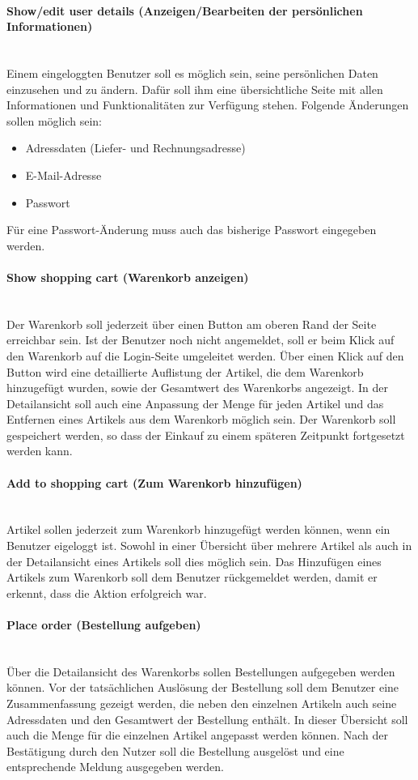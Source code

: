 \paragraph{Show/edit user details (Anzeigen/Bearbeiten der persönlichen Informationen)}$\;$ \\
Einem eingeloggten Benutzer soll es möglich sein, seine persönlichen Daten einzusehen und zu ändern.
Dafür soll ihm eine übersichtliche Seite mit allen Informationen und Funktionalitäten zur Verfügung stehen.
Folgende Änderungen sollen möglich sein:
\begin{itemize}
\item Adressdaten (Liefer- und Rechnungsadresse)
\item E-Mail-Adresse
\item Passwort
\end{itemize}
Für eine Passwort-Änderung muss auch das bisherige Passwort eingegeben werden.

\paragraph{Show shopping cart (Warenkorb anzeigen)}$\;$ \\
Der Warenkorb soll jederzeit über einen Button am oberen Rand der Seite erreichbar sein.
Ist der Benutzer noch nicht angemeldet, soll er beim Klick auf den Warenkorb auf die Login-Seite umgeleitet werden.
Über einen Klick auf den Button wird eine detaillierte Auflistung der Artikel, die dem Warenkorb hinzugefügt wurden, sowie der Gesamtwert des Warenkorbs angezeigt.
In der Detailansicht soll auch eine Anpassung der Menge für jeden Artikel und das Entfernen eines Artikels aus dem Warenkorb möglich sein.
Der Warenkorb soll gespeichert werden, so dass der Einkauf zu einem späteren Zeitpunkt fortgesetzt werden kann.
\paragraph{Add to shopping cart (Zum Warenkorb hinzufügen)}$\;$ \\
Artikel sollen jederzeit zum Warenkorb hinzugefügt werden können, wenn ein Benutzer eigeloggt ist. Sowohl in einer Übersicht über mehrere Artikel als auch in der Detailansicht eines Artikels soll dies möglich sein.
Das Hinzufügen eines Artikels zum Warenkorb soll dem Benutzer rückgemeldet werden, damit er erkennt, dass die Aktion erfolgreich war.
\paragraph{Place order (Bestellung aufgeben)}$\;$ \\
Über die Detailansicht des Warenkorbs sollen Bestellungen aufgegeben werden können.
Vor der tatsächlichen Auslösung der Bestellung soll dem Benutzer eine Zusammenfassung gezeigt werden, die neben den einzelnen Artikeln auch seine Adressdaten und den Gesamtwert der Bestellung enthält.
In dieser Übersicht soll auch die Menge für die einzelnen Artikel angepasst werden können.
Nach der Bestätigung durch den Nutzer soll die Bestellung ausgelöst und eine entsprechende Meldung ausgegeben werden.
